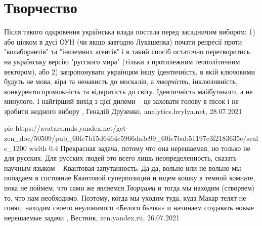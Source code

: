  
 
 
 
 
\chapter{Творчество}
\label{sec:slova.tvorchestvo}

Після такого одкровення українська влада постала перед засадничим вибором: 1)
або цілком в дусі ОУН (чи якщо завгодно Лукашенка) почати репресії проти
"колаборантів" та "іноземних агентів" і в такий спосіб остаточно перетворитись
на українську версію "русского мира" (тільки з протилежним геополітичним
вектором), або 2) запропонувати українцям іншу ідентичність, в якій ключовими
будуть не мова, віра та ненависть до москалів, а \emph{творчість},
інклюзивність, конкурентоспроможність та відкритість до світу. Ідентичність
майбутнього, а не минулого.  І найгірший вихід з цієї дилеми – це заховати
голову в пісок і не зробити жодного вибору
, 
Генадій Друзенко, analytics.hvylya.net, 28.07.2021

\ifcmt
  pic https://avatars.mds.yandex.net/get-zen_doc/50509/pub_60fe7b15d6464c5966da3e99_60fe7bab51197c3f2183635e/scale_1200
  width 0.4
\fi
Прекрасная задача, потому что она нерешаемая, но только не для русских. Для
русских людей это всего лишь неопределенность, сказать научным языком –
Квантовая запутанность. Да-да, вольно или не вольно мы попадаем в состояние
Квантовой суперпозиции и ищем кошку в темной комнате, пока не поймем, что сами
же являемся \emph{Творцами} и тогда мы находим (створяем) то, что нам необходимо.
Поэтому, когда мы уходим туда, куда Макар телят не гонял, находим своего
неуловимого «Белого бычка» и начинаем создавать новые нерешаемые задачи
, Вестник, zen.yandex.ru, 26.07.2021 
